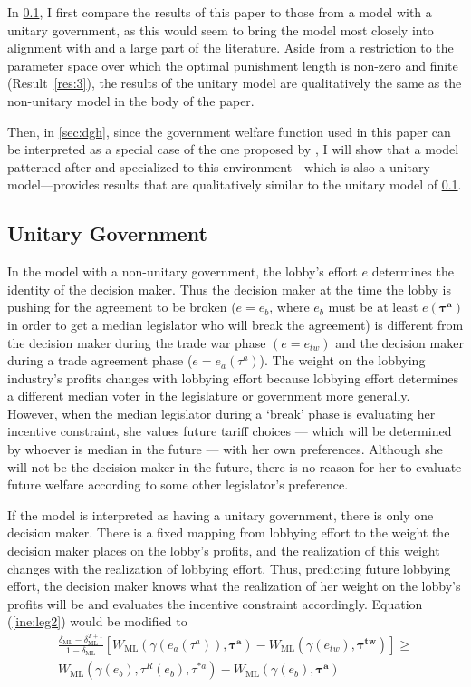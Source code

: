 \documentclass[authoryear, review]{elsarticle}
\newcommand{\ov}{\overline}
\newcommand{\bta}{\bm{\tau^a}}
\newcommand{\ga}{\gamma}
\newcommand{\btw}{\bm{\tau^{tw}}}
\newcommand{\de}{\delta}
\begin{document}
In \ref{sec:unitary}, I first compare the results of this paper to those from a model with a unitary government, as this would seem to bring the model most closely into alignment with \citet{mrc2007} and a large part of the literature. Aside from a restriction to the parameter space over which the optimal punishment length is non-zero and finite (Result~\ref{res:3}), the results of the unitary model are qualitatively the same as the non-unitary model in the body of the paper.

Then, in \ref{sec:dgh}, since the government welfare function used in this paper can be interpreted as a special case of the one proposed by \citet{dgh97}, I will show that a model patterned after \citet{dgh97} and specialized to this environment---which is also a unitary model---provides results that are qualitatively similar to the unitary model of \ref{sec:unitary}.

\subsection{Unitary Government}
\label{sec:unitary}
In the model with a non-unitary government, the lobby's effort $e$ determines the identity of the decision maker. Thus the decision maker at the time the lobby is pushing for the agreement to be broken ($e=e_b$, where $e_b$ must be at least $\ov{e}(\bta)$ in order to get a median legislator who will break the agreement) is different from the decision maker during the trade war phase $(e = e_{tw})$ and the decision maker during a trade agreement phase ($e=e_a(\tau^a)$). The weight on the lobbying industry's profits changes with lobbying effort because lobbying effort determines a different median voter in the legislature or government more generally. However, when the median legislator during a `break' phase is evaluating her incentive constraint, she values future tariff choices --- which will be determined by whoever is median in the future --- with her own preferences. Although she will not be the decision maker in the future, there is no reason for her to evaluate future welfare according to some other legislator's preference.

If the model is interpreted as having a unitary government, there is only one decision maker. There is a fixed mapping from lobbying effort to the weight the decision maker places on the lobby's profits, and the realization of this weight changes with the realization of lobbying effort. Thus, predicting future lobbying effort, the decision maker knows what the realization of her weight on the lobby's profits will be and evaluates the incentive constraint accordingly. Equation (\ref{ine:leg2}) would be modified to
\begin{multline}
  \frac{\de_\text{ML} - \de_\text{ML}^{T+1}}{1-\de_\text{ML}} \left[W_\text{ML}(\ga(e_a(\tau^a)),\bta) - W_{\text{ML}}(\ga(e_{tw}),\btw) \right] \geq \\
	W_{\text{ML}}(\ga(e_b),\tau^R(e_b),\tau^{*a}) - W_{\text{ML}}(\ga(e_b),\bta)
  \label{ine:leg3}
\end{multline}
\end{document}
